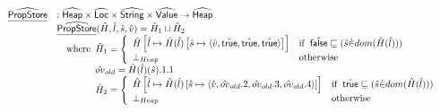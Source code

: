 \[\begin{array}{ll}

\widehat{\underline{\sf PropStore}} & : \widehat{\mbox{\textsf{Heap}}} \times \widehat{\mbox{\textsf{Loc}}} \times \widehat{\mbox{\textsf{String}}} \times \widehat{\mbox{\textsf{Value}}} \rightarrow \widehat{\mbox{\textsf{Heap}}} \\
& \widehat{\underline{\sf PropStore}}(\hat{H},\hat{l},\hat{s},\hat{v})
  = \hat{H}_1\sqcup\hat{H}_2\\
& \quad{\rm where}\begin{array}[t]{l}
\hat{H}_1 = \left\{
    \begin{array}{ll}
      \hat{H}\left[\hat{l}\mapsto \hat{H}(\hat{l})\left[\hat{s}\mapsto \langle\hat{v},\hat{\mbox{\textsf{true}}},\hat{\mbox{\textsf{true}}},\hat{\mbox{\textsf{true}}}\rangle\right]\right] & {\rm if}\begin{array}[t]{l}\hat{\mbox{\textsf{false}}}\sqsubseteq(\hat{s} \dot{\in} dom(\hat{H}(\hat{l})))\end{array} \\
      \bot_{Heap} & {\rm otherwise} \\
    \end{array}
  \right. \\
  \hat{ov}_{old}=\hat{H}(\hat{l})(\hat{s}).1.1\\
  \hat{H}_2 = \left\{
    \begin{array}{ll}
      \hat{H}\left[\hat{l}\mapsto \hat{H}(\hat{l})\left[\hat{s}\mapsto
          \langle \hat{v},\hat{ov}_{old}.2,\hat{ov}_{old}.3,\hat{ov}_{old}.4\rangle
        \right]\right] & {\rm if}\begin{array}[t]{l}\hat{\mbox{\textsf{true}}}\sqsubseteq (\hat{s} \dot{\in} dom(\hat{H}(\hat{l})))\end{array}\\
      \bot_{Heap} & {\rm otherwise} \\
    \end{array}
  \right. \\
\end{array}\\
\\


\end{array}\]
